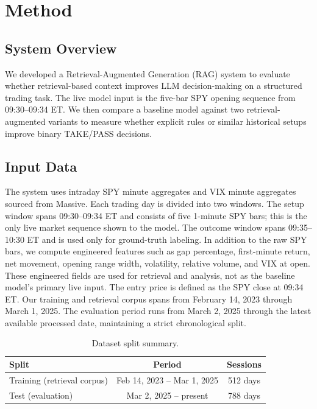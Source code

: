 \documentclass{article}
\begin{document}
\section{Method}

\subsection{System Overview}

We developed a Retrieval-Augmented Generation (RAG) system to evaluate whether retrieval-based context improves LLM decision-making on a structured trading task. The live model input is the five-bar SPY opening sequence from 09:30--09:34 ET. We then compare a baseline model against two retrieval-augmented variants to measure whether explicit rules or similar historical setups improve binary TAKE/PASS decisions.

\subsection{Input Data}

The system uses intraday SPY minute aggregates and VIX minute aggregates sourced from Massive. Each trading day is divided into two windows. The setup window spans 09:30--09:34 ET and consists of five 1-minute SPY bars; this is the only live market sequence shown to the model. The outcome window spans 09:35--10:30 ET and is used only for ground-truth labeling. In addition to the raw SPY bars, we compute engineered features such as gap percentage, first-minute return, net movement, opening range width, volatility, relative volume, and VIX at open. These engineered fields are used for retrieval and analysis, not as the baseline model's primary live input. The entry price is defined as the SPY close at 09:34 ET. Our training and retrieval corpus spans from February 14, 2023 through March 1, 2025. The evaluation period runs from March 2, 2025 through the latest available processed date, maintaining a strict chronological split.

\begin{table}[H]
\centering
\caption{Dataset split summary.}
\label{tab:dataset}
\begin{tabular}{lcc}
\toprule
\textbf{Split} & \textbf{Period} & \textbf{Sessions} \\
\midrule
Training (retrieval corpus) & Feb 14, 2023 -- Mar 1, 2025 & 512 days \\
Test (evaluation)           & Mar 2, 2025 -- present      & 788 days \\
\bottomrule
\end{tabular}
\end{table}
\end{document}
